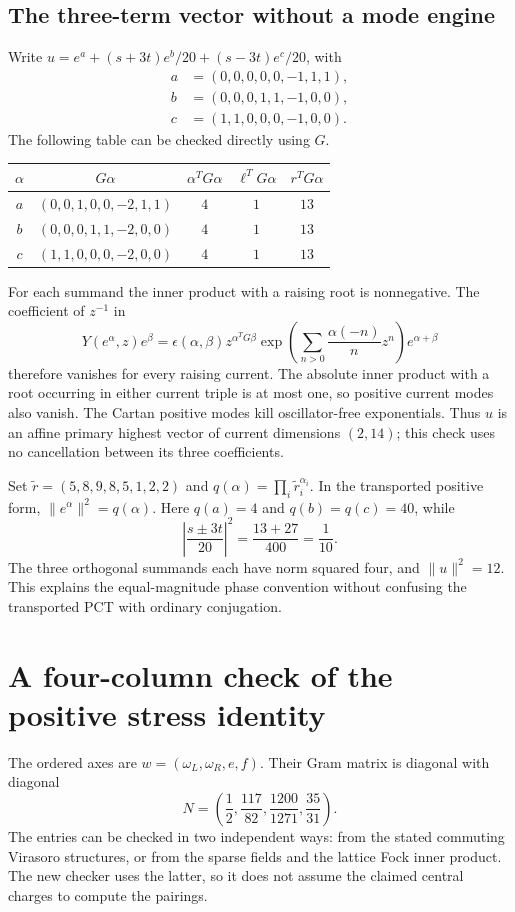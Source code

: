 \documentclass[11pt]{article}
\theoremstyle{remark}\newtheorem{remark}[proposition]{Remark}
\begin{document}
\subsection{The three-term vector without a mode engine}
\label{hr:three-term-vector}
Write $u=e^a+(s+3t)e^b/20+(s-3t)e^c/20$, with
\[
\begin{split}
a&=(0,0,0,0,0,-1,1,1),\\
b&=(0,0,0,1,1,-1,0,0),\\
c&=(1,1,0,0,0,-1,0,0).
\end{split}
\]
The following table can be checked directly using $G$.
\begin{center}\small
\begin{tabular}{@{}ccccc@{}}\toprule
$\alpha$ & $G\alpha$ & $\alpha^TG\alpha$ & $\ell^TG\alpha$ & $r^TG\alpha$\\\midrule
$a$ & $(0,0,1,0,0,-2,1,1)$ & $4$ & $1$ & $13$\\
$b$ & $(0,0,0,1,1,-2,0,0)$ & $4$ & $1$ & $13$\\
$c$ & $(1,1,0,0,0,-2,0,0)$ & $4$ & $1$ & $13$\\\bottomrule
\end{tabular}\end{center}
For each summand the inner product with a raising root is nonnegative.
The coefficient of $z^{-1}$ in
\[
Y(e^\alpha,z)e^\beta
=\epsilon(\alpha,\beta)z^{\alpha^TG\beta}
\exp\left(\sum_{n>0}\frac{\alpha(-n)}n z^n\right)e^{\alpha+\beta}
\]
therefore vanishes for every raising current. The absolute inner
product with a root occurring in either current triple is at most one,
so positive current modes also vanish. The Cartan positive modes kill
oscillator-free exponentials. Thus $u$ is an affine primary highest
vector of current dimensions $(2,14)$; this check uses no cancellation
between its three coefficients.

Set $\widetilde r=(5,8,9,8,5,1,2,2)$ and
$q(\alpha)=\prod_i\widetilde r_i^{\alpha_i}$. In the transported
positive form, $\|e^\alpha\|^2=q(\alpha)$. Here
$q(a)=4$ and $q(b)=q(c)=40$, while
\[
\left|\frac{s\pm3t}{20}\right|^2=\frac{13+27}{400}=\frac1{10}.
\]
The three orthogonal summands each have norm squared four, and
$\|u\|^2=12$. This explains the equal-magnitude phase convention
without confusing the transported PCT with ordinary conjugation.

\section{A four-column check of the positive stress identity}
\label{hr:positive-stress-check}
The ordered axes are $w=(\omega_L,\omega_R,e,f)$. Their Gram matrix
is diagonal with diagonal
\[
N=\left(\frac12,\frac{117}{82},\frac{1200}{1271},\frac{35}{31}\right).
\]
The entries can be checked in two independent ways: from the stated
commuting Virasoro structures, or from the sparse fields and the lattice
Fock inner product. The new checker uses the latter, so it does not
assume the claimed central charges to compute the pairings.
\end{document}
